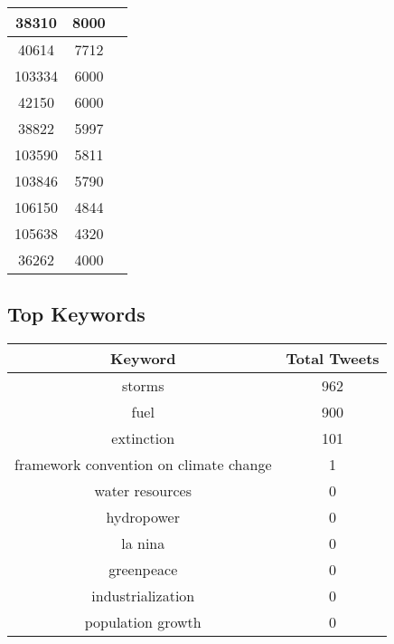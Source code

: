 \documentclass{article}\usepackage[T1]{fontenc}
\begin{document}
\begin{tabular}{|c|c|c|}
 \hline
38310 & 8000\\ 
 \hline
40614 & 7712\\ 
 \hline
103334 & 6000\\ 
 \hline
42150 & 6000\\ 
 \hline
38822 & 5997\\ 
 \hline
103590 & 5811\\ 
 \hline
103846 & 5790\\ 
 \hline
106150 & 4844\\ 
 \hline
105638 & 4320\\ 
 \hline
36262 & 4000\\ 
 \hline
\end{tabular}\subsection*{Top Keywords}\begin{tabular}{|c|c|}         \hline         Keyword & Total Tweets \\ 
 \hline
storms & 962\\ 
 \hline
fuel & 900\\ 
 \hline
extinction & 101\\ 
 \hline
framework convention on climate change & 1\\ 
 \hline
water resources & 0\\ 
 \hline
hydropower & 0\\ 
 \hline
la nina & 0\\ 
 \hline
greenpeace & 0\\ 
 \hline
industrialization & 0\\ 
 \hline
population growth & 0\\ 
 \hline
\end{tabular}
\end{document}
